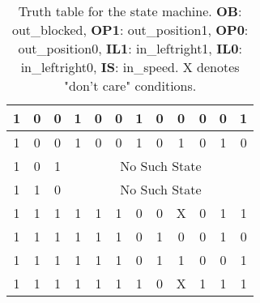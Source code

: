 \begin{table}[H]
\begin{tabular}{|c|c|c|c|c|c|c|c|c|c|c|c|}
        1  & 0  & 0  & 1  & 0& 0& 1& 0& 0& 0  & 0  & 1  \\ \hline
        1  & 0  & 0  & 1  & 0& 0& 1   & 0   & 1& 0& 1& 0  \\ \hline
        1  & 0  & 1  & \multicolumn{9}{c|}{No Such State}                \\ \hline
        1  & 1  & 0  & \multicolumn{9}{c|}{No Such State}                \\ \hline
        1  & 1  & 1  & 1  & 1& 1& 0   & 0   & X  & 0  & 1& 1\\ \hline
        1  & 1  & 1  & 1  & 1& 1& 0   & 1   & 0& 0& 1  & 0\\ \hline
        1  & 1  & 1  & 1  & 1& 1& 0& 1& 1& 0  & 0  & 1  \\ \hline
        1  & 1  & 1  & 1  & 1& 1& 1   & 0   & X& 1& 1  & 1\\ \hline
    \end{tabular}
    \caption{Truth table for the state machine. \textbf{OB}: out\_blocked, \textbf{OP1}: out\_position1, \textbf{OP0}: out\_position0, \textbf{IL1}: in\_leftright1, \textbf{IL0}: in\_leftright0, \textbf{IS}: in\_speed. X denotes "don't care" conditions.}
    \label{tab:truth_table}
\end{table}

